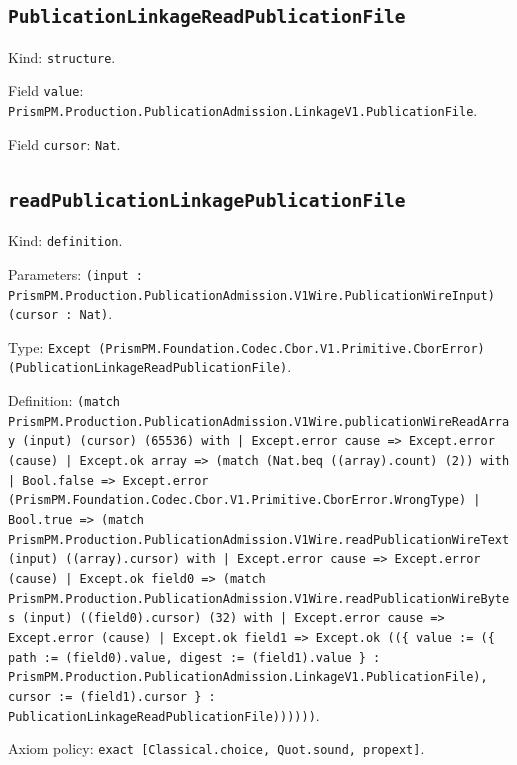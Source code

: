 \documentclass[11pt]{article}
\begin{document}
\subsection*{\texttt{PublicationLinkageReadPublicationFile}}
\noindent Kind: \texttt{structure}.\par
\noindent Field \texttt{value}: \texttt{PrismPM.Production.PublicationAdmission.LinkageV1.PublicationFile}.\par
\noindent Field \texttt{cursor}: \texttt{Nat}.\par
\subsection*{\texttt{readPublicationLinkagePublicationFile}}
\noindent Kind: \texttt{definition}.\par
\noindent Parameters: \texttt{(input : PrismPM.Production.PublicationAdmission.V1Wire.PublicationWireInput) (cursor : Nat)}.\par
\noindent Type: \texttt{Except (PrismPM.Foundation.Codec.Cbor.V1.Primitive.CborError) (PublicationLinkageReadPublicationFile)}.\par
\noindent Definition: \texttt{(match PrismPM.Production.PublicationAdmission.V1Wire.publicationWireReadArray (input) (cursor) (65536) with | Except.error cause => Except.error (cause) | Except.ok array => (match (Nat.beq ((array).count) (2)) with | Bool.false => Except.error (PrismPM.Foundation.Codec.Cbor.V1.Primitive.CborError.WrongType) | Bool.true => (match PrismPM.Production.PublicationAdmission.V1Wire.readPublicationWireText (input) ((array).cursor) with | Except.error cause => Except.error (cause) | Except.ok field0 => (match PrismPM.Production.PublicationAdmission.V1Wire.readPublicationWireBytes (input) ((field0).cursor) (32) with | Except.error cause => Except.error (cause) | Except.ok field1 => Except.ok ((\{ value := (\{ path := (field0).value, digest := (field1).value \} : PrismPM.Production.PublicationAdmission.LinkageV1.PublicationFile), cursor := (field1).cursor \} : PublicationLinkageReadPublicationFile))))))}.\par
\noindent Axiom policy: \texttt{exact [Classical.choice, Quot.sound, propext]}.\par
\end{document}

